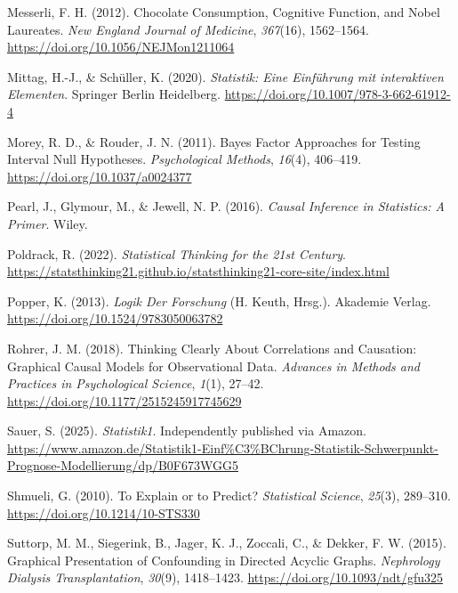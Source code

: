 \documentclass[
  ngerman,
  letterpaper,
  twoside,
  open=any]{scrbook}
\newlength{\cslhangindent}
\newenvironment{CSLReferences}[2] %
 {\begin{list}{}{%
  \setlength{\itemindent}{0pt}
  \setlength{\leftmargin}{0pt}
  \setlength{\parsep}{0pt}
  \ifodd #1
   \setlength{\leftmargin}{\cslhangindent}
   \setlength{\itemindent}{-1\cslhangindent}
  \fi
  \setlength{\itemsep}{#2\baselineskip}}}
 {\end{list}}
\theoremstyle{definition}
\theoremstyle{plain}
\theoremstyle{definition}
\theoremstyle{definition}
\theoremstyle{definition}
\theoremstyle{definition}
\theoremstyle{remark}
\begin{document}
\begin{CSLReferences}{1}{0}
Messerli, F. H. (2012). Chocolate {Consumption}, {Cognitive Function},
and {Nobel Laureates}. \emph{New England Journal of Medicine},
\emph{367}(16), 1562--1564. \url{https://doi.org/10.1056/NEJMon1211064}

Mittag, H.-J., \& Schüller, K. (2020). \emph{Statistik: Eine Einführung
mit interaktiven Elementen}. Springer Berlin Heidelberg.
\url{https://doi.org/10.1007/978-3-662-61912-4}

Morey, R. D., \& Rouder, J. N. (2011). Bayes Factor Approaches for
Testing Interval Null Hypotheses. \emph{Psychological Methods},
\emph{16}(4), 406--419. \url{https://doi.org/10.1037/a0024377}

Pearl, J., Glymour, M., \& Jewell, N. P. (2016). \emph{Causal Inference
in Statistics: A Primer}. Wiley.

Poldrack, R. (2022). \emph{Statistical {Thinking} for the 21st
{Century}}.
\url{https://statsthinking21.github.io/statsthinking21-core-site/index.html}

Popper, K. (2013). \emph{Logik Der {Forschung}} (H. Keuth, Hrsg.).
Akademie Verlag. \url{https://doi.org/10.1524/9783050063782}

Rohrer, J. M. (2018). Thinking {Clearly About Correlations} and
{Causation}: {Graphical Causal Models} for {Observational Data}.
\emph{Advances in Methods and Practices in Psychological Science},
\emph{1}(1), 27--42. \url{https://doi.org/10.1177/2515245917745629}

Sauer, S. (2025). \emph{Statistik1}. Independently published via Amazon.
\url{https://www.amazon.de/Statistik1-Einf\%C3\%BChrung-Statistik-Schwerpunkt-Prognose-Modellierung/dp/B0F673WGG5}

Shmueli, G. (2010). To {Explain} or to {Predict}? \emph{Statistical
Science}, \emph{25}(3), 289--310.
\url{https://doi.org/10.1214/10-STS330}

Suttorp, M. M., Siegerink, B., Jager, K. J., Zoccali, C., \& Dekker, F.
W. (2015). Graphical Presentation of Confounding in Directed Acyclic
Graphs. \emph{Nephrology Dialysis Transplantation}, \emph{30}(9),
1418--1423. \url{https://doi.org/10.1093/ndt/gfu325}


\end{CSLReferences}
\end{document}
